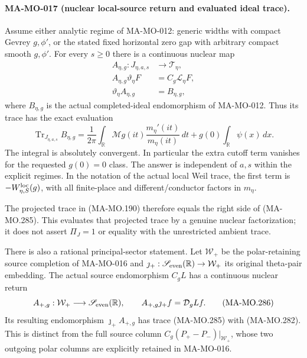 \paragraph{MA-MO-017 (nuclear local-source return and evaluated ideal trace).}
Assume either analytic regime of MA-MO-012: generic widths with
compact Gevrey \(g,\phi'\), or the stated fixed horizontal zero
gap with arbitrary compact smooth \(g,\phi'\). For every
\(s\ge0\) there is a continuous nuclear map
\[
 \begin{aligned}
 A_{\eta,g}:J_{\eta,a,s}&\longrightarrow\mathcal T_\eta,\\
 A_{\eta,g}\vartheta_\eta F&=C_g\mathcal L_\eta F,\\
 \vartheta_\eta A_{\eta,g}&=B_{\eta,g},
 \end{aligned}
 \tag{MA-MO.284}
\]
where \(B_{\eta,g}\) is the actual completed-ideal endomorphism
of MA-MO-012. Thus its trace has the exact evaluation
\[
 \boxed{\displaystyle
 \operatorname{Tr}_{J_{\eta,a,s}}B_{\eta,g}
   =\frac1{2\pi}\int_{\mathbb R}
          \mathcal Mg(it)\frac{m_\eta'(it)}{m_\eta(it)}\,dt
       +g(0)\int_{\mathbb R}\psi(x)\,dx .}
 \tag{MA-MO.285}
\]
The integral is absolutely convergent. In particular the extra
cutoff term vanishes for the requested \(g(0)=0\) class.
The answer is independent of \(a,s\) within the explicit
regimes. In the notation of the actual local Weil trace,
the first term is \(-W^{\rm loc}_{\eta,S}(g)\), with
all finite-place and different/conductor factors in \(m_\eta\).

The projected trace in (MA-MO.190) therefore equals the right
side of (MA-MO.285). This evaluates that projected trace by a
genuine nuclear factorization; it does not assert
\(\Pi_J=1\) or equality with the unrestricted ambient trace.

There is also a rational principal-sector statement. Let
\(\mathcal W_+\) be the polar-retaining source completion of
MA-MO-016 and \(\jmath_+:\mathscr S_{\rm even}(\mathbb R)
\to\mathcal W_+\) its original theta-pair embedding. The
actual source endomorphism \(C_gL\) has a continuous nuclear
return
\[
 A_{+,g}:\mathcal W_+\longrightarrow
                    \mathscr S_{\rm even}(\mathbb R),\qquad
 A_{+,g}\jmath_+f=\mathcal D_gLf.
 \tag{MA-MO.286}
\]
Its resulting endomorphism \(\jmath_+A_{+,g}\) has trace
(MA-MO.285) with (MA-MO.282). This is distinct from the full
source column \(C_g(P_+-P_-)|_{\mathcal W_+}\), whose two
outgoing polar columns are explicitly retained in MA-MO-016.

